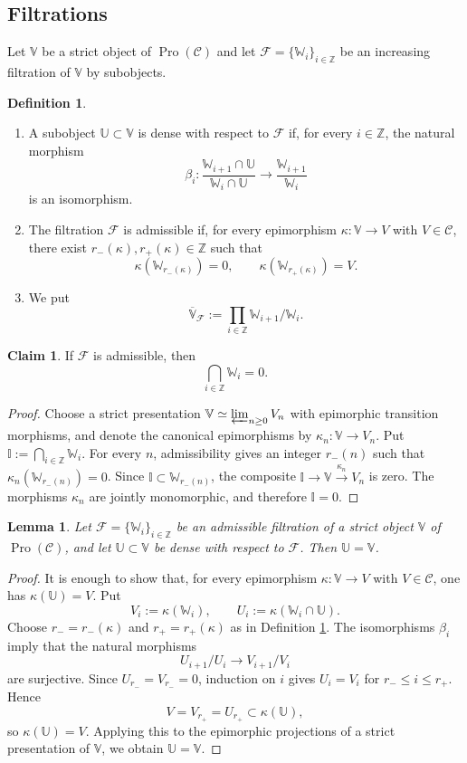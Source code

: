 \documentclass[11pt,a4paper,twoside]{amsart}
\newtheorem{lemma}[theorem]{Lemma}
\theoremstyle{definition}
\newtheorem{definition}[theorem]{Definition}
\newtheorem{claim}[theorem]{Claim}
\theoremstyle{remark}
\newcommand{\mI}{\mathbb I}
\newcommand{\mU}{\mathbb U}
\newcommand{\mV}{\mathbb V}
\newcommand{\mW}{\mathbb W}
\newcommand{\kk}{\kappa}
\newcommand{\mcC}{\mathcal C}
\newcommand{\mcF}{\mathcal F}
\newcommand{\ZZ}{\mathbb Z}
\newcommand{\Pro}{\operatorname{Pro}}
\begin{document}
\subsection{Filtrations}
Let $\mV$ be a strict object of $\Pro(\mcC)$ and let $\mcF=\{\mW_i\}_{i\in\ZZ}$ be an increasing filtration of $\mV$ by subobjects.
\begin{definition}\label{admissible}
\begin{enumerate}
\item A subobject $\mU\subset\mV$ is dense with respect to $\mcF$ if, for every $i\in\ZZ$, the natural morphism
$$
\beta_i:\frac{\mW_{i+1}\cap\mU}{\mW_i\cap\mU}\longrightarrow\frac{\mW_{i+1}}{\mW_i}
$$
is an isomorphism.
\item The filtration $\mcF$ is admissible if, for every epimorphism $\kk:\mV\to V$ with $V\in\mcC$, there exist $r_-(\kk),r_+(\kk)\in\ZZ$ such that
$$
\kk(\mW_{r_-(\kk)})=0,\qquad \kk(\mW_{r_+(\kk)})=V.
$$
\item We put
$$
\overline{\mV}_{\mcF}:=\prod_{i\in\ZZ}\mW_{i+1}/\mW_i.
$$
\end{enumerate}
\end{definition}
\begin{claim}\label{separated}
If $\mcF$ is admissible, then
$$
\bigcap_{i\in\ZZ}\mW_i=0.
$$
\end{claim}
\begin{proof}
Choose a strict presentation $\mV\simeq\varprojlim_{n\geq0}V_n$ with epimorphic transition morphisms, and denote the canonical epimorphisms by $\kk_n:\mV\to V_n$. Put $\mI:=\bigcap_{i\in\ZZ}\mW_i$. For every $n$, admissibility gives an integer $r_-(n)$ such that $\kk_n(\mW_{r_-(n)})=0$. Since $\mI\subset\mW_{r_-(n)}$, the composite $\mI\to\mV\xrightarrow{\kk_n}V_n$ is zero. The morphisms $\kk_n$ are jointly monomorphic, and therefore $\mI=0$.
\end{proof}
\begin{lemma}\label{dense}
Let $\mcF=\{\mW_i\}_{i\in\ZZ}$ be an admissible filtration of a strict object $\mV$ of $\Pro(\mcC)$, and let $\mU\subset\mV$ be dense with respect to $\mcF$. Then $\mU=\mV$.
\end{lemma}
\begin{proof}
It is enough to show that, for every epimorphism $\kk:\mV\to V$ with $V\in\mcC$, one has $\kk(\mU)=V$. Put
$$
V_i:=\kk(\mW_i),\qquad U_i:=\kk(\mW_i\cap\mU).
$$
Choose $r_-=r_-(\kk)$ and $r_+=r_+(\kk)$ as in Definition \ref{admissible}. The isomorphisms $\beta_i$ imply that the natural morphisms
$$
U_{i+1}/U_i\longrightarrow V_{i+1}/V_i
$$
are surjective.
 Since $U_{r_-}=V_{r_-}=0$, induction on $i$ gives $U_i=V_i$ for $r_-\leq i\leq r_+$. Hence
$$
V=V_{r_+}=U_{r_+}\subset\kk(\mU),
$$
so $\kk(\mU)=V$. Applying this to the epimorphic projections of a strict presentation of $\mV$, we obtain $\mU=\mV$.
\end{proof}
\end{document}
